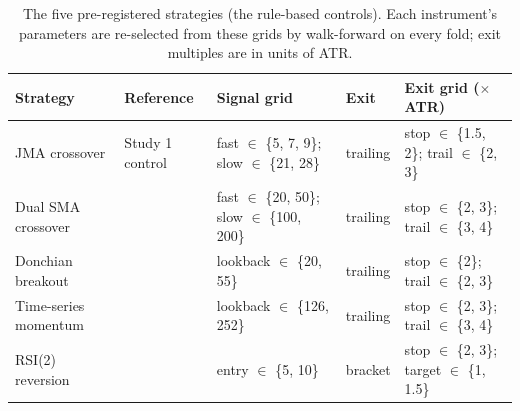 \begin{table}[!t]
\centering
\caption{The five pre-registered strategies (the rule-based controls). Each instrument's parameters are re-selected from these grids by walk-forward on every fold; exit multiples are in units of ATR.}
\label{tab:s2strat}
\footnotesize
\begin{tabular}{l l l l l}
\toprule
Strategy & Reference & Signal grid & Exit & Exit grid ($\times$ATR) \\
\midrule
JMA crossover & Study 1 control & fast $\in$ \{5, 7, 9\}; slow $\in$ \{21, 28\} & trailing & stop $\in$ \{1.5, 2\}; trail $\in$ \{2, 3\} \\
Dual SMA crossover & \cite{brock1992simple} & fast $\in$ \{20, 50\}; slow $\in$ \{100, 200\} & trailing & stop $\in$ \{2, 3\}; trail $\in$ \{3, 4\} \\
Donchian breakout & \cite{faith2007turtle} & lookback $\in$ \{20, 55\} & trailing & stop $\in$ \{2\}; trail $\in$ \{2, 3\} \\
Time-series momentum & \cite{moskowitz2012momentum} & lookback $\in$ \{126, 252\} & trailing & stop $\in$ \{2, 3\}; trail $\in$ \{3, 4\} \\
RSI(2) reversion & \cite{connors2008short} & entry $\in$ \{5, 10\} & bracket & stop $\in$ \{2, 3\}; target $\in$ \{1, 1.5\} \\
\bottomrule
\end{tabular}
\end{table}
